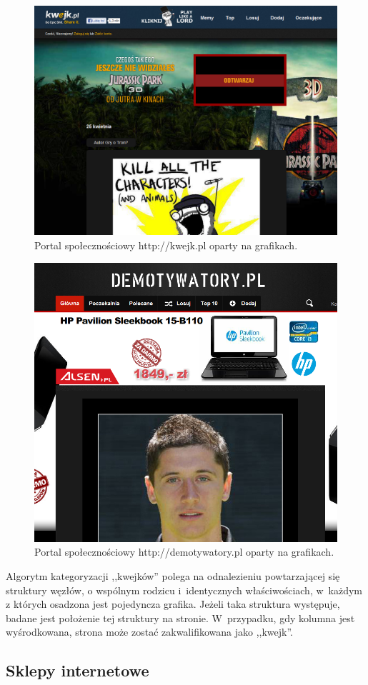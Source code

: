 \documentclass[a4paper,10pt]{article}
\begin{document}
\begin{figure}[h!]
\centering
  \includegraphics[width=.9\textwidth]{image_meme_kwejk.png}
  \caption{Portal społecznościowy http://kwejk.pl oparty na grafikach.}
  \label{fig:image_meme_kwejk}
\end{figure}

\begin{figure}[h!]
\centering
  \includegraphics[width=.9\textwidth]{image_meme_demotywatory.png}
  \caption{Portal społecznościowy http://demotywatory.pl oparty na grafikach.}
  \label{fig:image_meme_demotywatory}
\end{figure}

Algorytm kategoryzacji ,,kwejków'' polega na odnalezieniu powtarzającej się struktury węzłów, o wspólnym rodzicu i~identycznych właściwościach, w~każdym z których osadzona jest pojedyncza grafika. Jeżeli taka struktura występuje, badane jest położenie tej struktury na stronie. W~przypadku, gdy kolumna jest wyśrodkowana, strona może zostać zakwalifikowana jako ,,kwejk''.

\subsection*{Sklepy internetowe}
\end{document}
